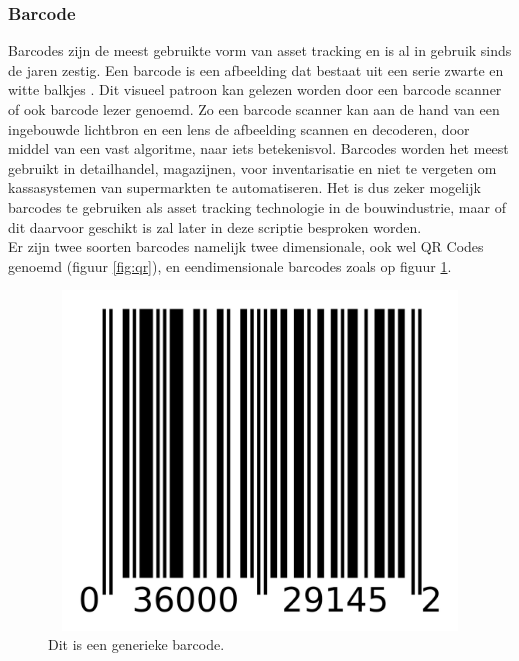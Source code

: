 \subsubsection{Barcode}
Barcodes zijn de meest gebruikte vorm van asset tracking \autocite{Penny2022} en is al in gebruik sinds de jaren zestig. Een barcode is een afbeelding dat bestaat uit een serie zwarte en witte balkjes \autocite{Rankin2020}. Dit visueel patroon kan gelezen worden door een barcode scanner of ook barcode lezer genoemd. Zo een barcode scanner kan aan de hand van een ingebouwde lichtbron en een lens de afbeelding scannen en decoderen, door middel van een vast algoritme, naar iets betekenisvol. Barcodes worden het meest gebruikt in detailhandel, magazijnen, voor inventarisatie en niet te vergeten om kassasystemen van supermarkten te automatiseren. Het is dus zeker mogelijk barcodes te gebruiken als asset tracking technologie in de bouwindustrie, maar of dit daarvoor geschikt is zal later in deze scriptie besproken worden.\\

Er zijn twee soorten barcodes namelijk twee dimensionale, ook wel QR Codes genoemd (figuur \ref{fig:qr}), en eendimensionale barcodes zoals op figuur \ref{fig:bar}.

\begin{figure}
    \includegraphics[width=12cm, height=9cm]{barcode.png}
    \caption[Barcode]{Dit is een generieke barcode.}
    \label{fig:bar}
\end{figure}

